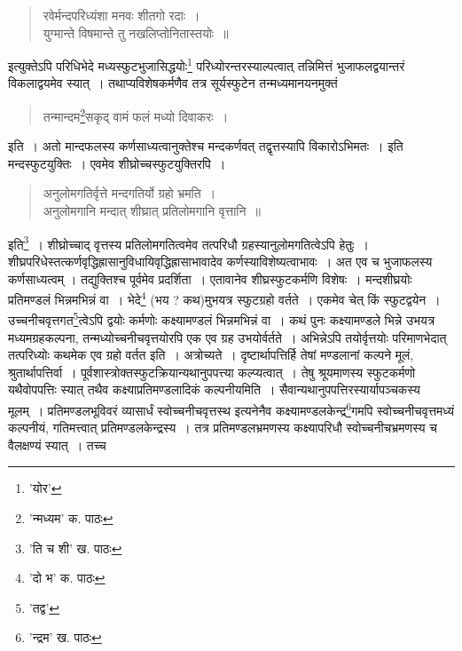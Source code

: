 \documentclass[11pt, openany]{book}
\begin{document}
{{{{{\vspace{0.3cm}
\begin{quote}
{\qt रवेर्मन्दपरिध्यंशा मनवः शीतगो रदाः~।\\
युग्मान्ते विषमान्ते तु नखलिप्तोनितास्तयोः~॥}
\end{quote}

\noindent इत्युक्तेऽपि परिधिभेदे मध्यस्फुटभुजासिद्धयोः\renewcommand{\thefootnote}{१}\footnote{'योर'} परिध्योरन्तरस्याल्पत्वात् तन्निमित्तं भुजाफलद्वयान्तरं विकलाद्वयमेव स्यात्~। तथाप्यविशेषकर्मणैव तत्र सूर्यस्फुटेन तन्मध्यमानयनमुक्तं\textendash 

\begin{quote}
{\qt तन्मान्दम\renewcommand{\thefootnote}{२}\footnote{'न्मध्यम' क. पाठः}सकृद् वामं फलं मध्यो दिवाकरः~।}
\end{quote}

\noindent इति~। अतो मान्दफलस्य कर्णसाध्यत्वानुक्तेश्च मन्दकर्णवत् तद्वृत्तस्यापि विकारोऽभिमतः~। इति मन्दस्फुटयुक्तिः~। एवमेव शीघ्रोच्चस्फुटयुक्तिरपि~।

\begin{quote}
{\qt अनुलोमगतिर्वृत्ते मन्दगतिर्यो ग्रहो भ्रमति~।\\
अनुलोमगानि मन्दात् शीघ्रात् प्रतिलोमगानि वृत्तानि~॥}
\end{quote}

\noindent इति\renewcommand{\thefootnote}{३}\footnote{'ति च शी' ख. पाठः}~। शीघ्रोच्चाद् वृत्तस्य प्रतिलोमगतित्वमेव तत्परिधौ ग्रहस्यानुलोमगतित्वेऽपि हेतुः~। शीघ्रपरिधेस्तत्कर्णवृद्धिह्रासानुविधायिवृद्धिह्रासाभावादेव कर्णस्याविशेष्यत्वाभावः~। अत एव च भुजाफलस्य कर्णसाध्यत्वम् । तद्युक्तिश्च पूर्वमेव प्रदर्शिता~। एतावानेव शीघ्रस्फुटकर्मणि विशेषः~। मन्दशीघ्रयोः प्रतिमण्डलं भिन्नमभिन्नं वा~। भेदे\renewcommand{\thefootnote}{४}\footnote{'दो भ' क. पाठः} (भय ? कथ)मुभयत्र स्फुटग्रहो
वर्तते~। एकमेव चेत् किं स्फुटद्वयेन~। उच्चनीचवृत्तगत\renewcommand{\thefootnote}{५}\footnote{'तद्व'}त्वेऽपि द्वयोः कर्मणोः कक्ष्यामण्डलं भिन्नमभिन्नं वा~। कथं पुनः कक्ष्यामण्डले भिन्ने उभयत्र मध्यमग्रहकल्पना, तन्मध्योच्चनीचवृत्तयोरपि एक एव ग्रह उभयोर्वर्तते~। अभिन्नेऽपि तयोर्वृत्तयोः परिमाणभेदात् तत्परिध्योः कथमेक एव ग्रहो वर्तत इति~। अत्रोच्यते~। दृष्टार्थापत्तिर्हि तेषां मण्डलानां कल्पने मूलं, श्रुतार्थापत्तिर्वा~। पूर्वशास्त्रोक्तस्फुटक्रियान्यथानुपपत्त्या कल्प्यत्वात्~। तेषु श्रूयमाणस्य स्फुटकर्मणो यथैवोपपत्तिः स्यात् तथैव कक्ष्याप्रतिमण्डलादिकं कल्पनीयमिति~। सैवान्यथानुपपत्तिरस्यार्यापञ्चकस्य मूलम्~। {\qt प्रतिमण्डलभूविवरं व्यासार्धं स्वोच्चनीचवृत्तस्थ} इत्यनेनैव कक्ष्यामण्डलकेन्द्र\renewcommand{\thefootnote}{६}\footnote{'न्द्रम' ख. पाठः}गमपि स्वोच्चनीचवृत्तमध्यं कल्पनीयं, गतिमत्त्वात् प्रतिमण्डलकेन्द्रस्य~। तत्र प्रतिमण्डलभ्रमणस्य कक्ष्यापरिधौ स्वोच्चनीचभ्रमणस्य च वैलक्षण्यं स्यात्~। तच्च 

}}}}}
\end{document}
